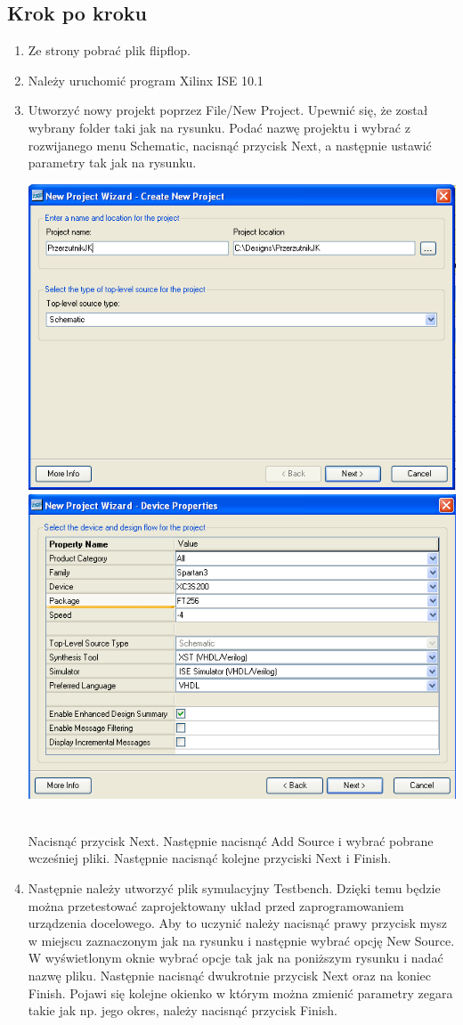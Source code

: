 \documentclass[12pt]{article}
\begin{document}
\subsection{Krok po kroku}
\begin{enumerate}[wide, labelwidth=!, labelindent=0pt]	
\item Ze strony pobrać plik flipflop.
\item Należy uruchomić program Xilinx ISE 10.1
\item Utworzyć nowy projekt poprzez File/New Project.
Upewnić się, że został wybrany folder taki jak na rysunku. Podać nazwę projektu i wybrać z rozwijanego menu Schematic, nacisnąć przycisk Next, a następnie ustawić parametry tak jak na rysunku.
\\\centerline{\includegraphics[width=0.49\linewidth]{1.PNG}\includegraphics[width=0.49\linewidth]{2.PNG}} \\
Nacisnąć przycisk Next. Następnie nacisnąć Add Source i wybrać pobrane wcześniej pliki. Następnie nacisnąć kolejne przyciski Next i Finish.
\item Następnie należy utworzyć plik symulacyjny Testbench. Dzięki temu będzie można przetestować zaprojektowany układ przed zaprogramowaniem urządzenia docelowego. Aby to uczynić należy nacisnąć prawy przycisk mysz w miejscu zaznaczonym jak na rysunku i następnie wybrać opcję New Source. W wyświetlonym oknie wybrać opcje tak jak na poniższym rysunku i nadać nazwę pliku. Następnie nacisnąć dwukrotnie przycisk Next oraz na koniec Finish. Pojawi się kolejne okienko w którym można zmienić parametry zegara takie jak np. jego okres, należy nacisnąć przycisk Finish. \\

\end{enumerate}
\end{document}
